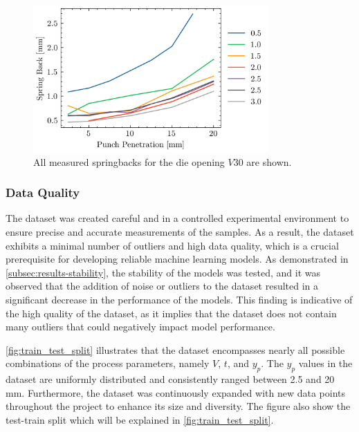 {\begin{figure}[h]
    \begin{tcolorbox}[arc=0pt,boxrule=0.5pt]
        \centering
        \includegraphics[width=0.8\textwidth]{chap4/images/all-springbacks-consolidated}
    \end{tcolorbox}
    \caption{All measured springbacks for the die opening $V30$ are shown. }
    \label{fig:v30_springbacks}
\end{figure}

\subsubsection{Data Quality}
The dataset was created careful and in a controlled experimental environment to ensure precise and accurate
measurements of the samples.
As a result, the dataset exhibits a minimal number of outliers and high data quality, which is a crucial prerequisite
for developing reliable machine learning models.
As demonstrated in \cref{subsec:results-stability}, the stability of the models was tested, and it was observed that
the addition of noise or outliers to the dataset resulted in a significant decrease in the performance of the models.
This finding is indicative of the high quality of the dataset, as it implies that the dataset does not contain many
outliers that could negatively impact model performance.

\cref{fig:train_test_split} illustrates that the dataset encompasses nearly all possible combinations of the
process parameters, namely $V$, $t$, and $y_p$.
The $y_p$ values in the dataset are uniformly distributed and consistently ranged between 2.5 and 20 mm.
Furthermore, the dataset was continuously expanded with new data points throughout the project to enhance its size and
diversity.
The figure also show the test-train split which will be explained in \cref{fig:train_test_split}.

}
